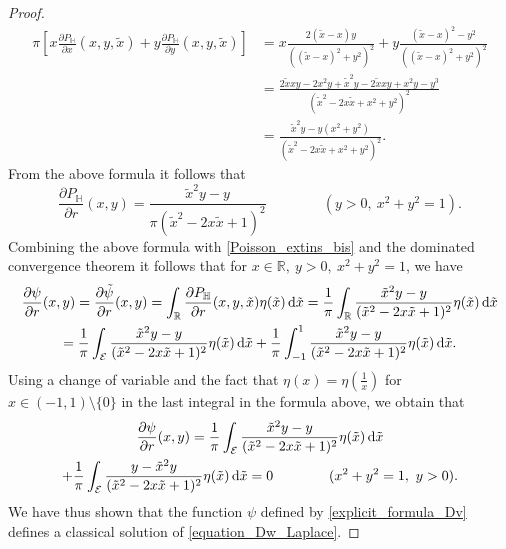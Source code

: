 \documentclass{amsart} %
\numberwithin{equation}{section}
\theoremstyle{definition}
\begin{document}
\begin{proof}
\begin{equation*}
\begin{aligned}
   \pi \left[ x\frac{\partial P_\mathbb{H}}{\partial x}(x,y,\tilde x)+y\frac{\partial P_\mathbb{H}}{\partial y}(x,y,\tilde x)\right]&=x\frac{2(\tilde{x} - x) y}{((\tilde{x} - x)^2 + y^2)^2}+y\frac{(\tilde{x} - x)^2 - y^2}{((\tilde{x} - x)^2 + y^2)^2}\\
    &=\frac{2\tilde x x y-2x^2y+\tilde x^2y-2\tilde x x y+x^2y-y^3}{(\tilde x^2-2x\tilde x+x^2+y^2)^2}\\
    &=\frac{\tilde x^2y-y(x^2+y^2)}{(\tilde x^2-2x\tilde x+x^2+y^2)^2}.
\end{aligned}
\end{equation*}
From the above formula it follows that
\begin{equation*}
\frac{\partial P_\mathbb{H}}{\partial r}(x,y)=\frac{\tilde x^2 y-y}{\pi(\tilde x^2-2x \tilde x+1)^2} \qquad\qquad(y>0,\ x^2+y^2=1).
\end{equation*}
Combining the above formula with \eqref{Poisson_extins_bis} and the dominated convergence theorem it follows that for $x\in\mathbb{R},\ y>0,\ x^2+y^2=1$, we have
\begin{multline*}
\frac{\partial \psi}{\partial r}(x,y)=\frac{\partial\tilde\psi}{\partial r}(x,y)=\int_\mathbb{R} \frac{\partial P_\mathbb{H}}{\partial r}(x,y,\tilde x) \eta(\tilde x)\, {\rm d}\tilde x
=\frac1\pi \int_\mathbb{R} \frac{\tilde x^2 y-y}{(\tilde x^2-2x \tilde x+1)^2} \eta(\tilde x)\, {\rm d}\tilde x\\
=\frac1\pi \int_\mathcal{E} \frac{\tilde x^2 y-y}{(\tilde x^2-2x \tilde x+1)^2} \eta(\tilde x)\, {\rm d}\tilde x
+\frac1\pi \int_{-1}^1 \frac{\tilde x^2 y-y}{(\tilde x^2-2x \tilde x+1)^2} \eta(\tilde x)\, {\rm d}\tilde x.
\end{multline*}
Using a change of variable and the fact that $\eta(x)=\eta\left(\frac1x\right)$ for $x\in (-1,1)\setminus \{0\}$ in the last integral in the formula above, we obtain that
\begin{multline*}
\frac{\partial \psi}{\partial r}(x,y)
=\frac1\pi \int_\mathcal{E} \frac{\tilde x^2 y-y}{(\tilde x^2-2x \tilde x+1)^2} \eta(\tilde x)\, {\rm d}\tilde x\\
+\frac1\pi \int_\mathcal{E} \frac{y-\tilde x^2 y}{(\tilde x^2-2x \tilde x+1)^2} \eta(\tilde x)\, {\rm d}\tilde x=0 \qquad\qquad(x^2+y^2=1,\ y>0).
\end{multline*}
We have thus shown that the function $\psi$ defined by \eqref{explicit_formula_Dv} defines a classical solution of \eqref{equation_Dw_Laplace}.


\end{proof}
\end{document}

